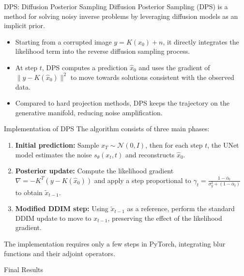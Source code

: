 \begin{frame}{DPS: Diffusion Posterior Sampling}
  Diffusion Posterior Sampling (DPS) is a method for solving noisy inverse problems by leveraging diffusion models as an implicit prior.
  \begin{itemize}
    \item Starting from a corrupted image $y = K(x_0) + n$, it directly integrates the likelihood term into the reverse diffusion sampling process.
    \item At step $t$, DPS computes a prediction $\hat x_0$ and uses the gradient of $\|y - K(\hat x_0)\|^2$ to move towards solutions consistent with the observed data.
    \item Compared to hard projection methods, DPS keeps the trajectory on the generative manifold, reducing noise amplification.
  \end{itemize}
\end{frame}

\begin{frame}[fragile]{Implementation of DPS}
  The algorithm consists of three main phases:
  \begin{enumerate}
    \item \textbf{Initial prediction:} Sample $x_T \sim \mathcal{N}(0, I)$, then for each step $t$, the UNet model estimates the noise $s_\theta(x_t, t)$ and reconstructs $\hat x_0$.
    \item \textbf{Posterior update:} Compute the likelihood gradient $\nabla = -K^T(y - K(\hat x_0))$ and apply a step proportional to $\gamma_t = \frac{1 - \bar\alpha_t}{\sigma_y^2 + (1 - \bar\alpha_t)}$ to obtain $\tilde x_{t-1}$.
    \item \textbf{Modified DDIM step:} Using $\tilde x_{t-1}$ as a reference, perform the standard DDIM update to move to $x_{t-1}$, preserving the effect of the likelihood gradient.
  \end{enumerate}
  \vspace{0.5em}
  The implementation requires only a few steps in PyTorch, integrating blur functions and their adjoint operators.
\end{frame}

\begin{frame}{Final Results}
\end{frame}